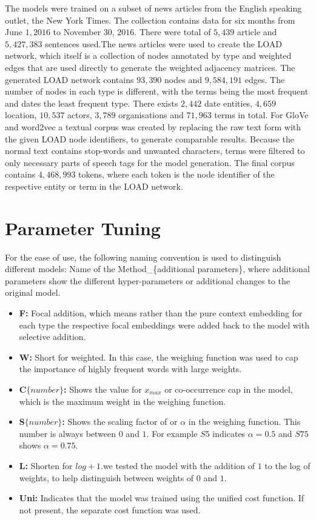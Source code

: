 The models were trained on a subset of news articles from the English speaking outlet, the New York Times. The collection contains data for six months from June $1, 2016$ to November $30$, $2016$. There were total of $5,439$ article and $5,427,383$ sentences used.The news articles were used to create the LOAD network, which itself is a collection of nodes annotated by type and weighted edges that are used directly to generate the weighted adjacency matrices. The generated LOAD network contains $93,390$ nodes and $9,584,191$ edges. The number of nodes in each type is different, with the terms being the most frequent and dates the least frequent type. There exists $2,442$ date entities, $4,659$ location, $10,537$ actors, $3,789$ organisations and $71,963$ terms in total. For GloVe and word2vec a textual corpus was created by replacing the raw text form with the given LOAD node identifiers, to generate comparable results. Because the normal text contains stop-words and unwanted characters, terms were filtered to only necessary parts of speech tags for the model generation. The final corpus contains $4,468,993$ tokens, where each token is the node identifier of the respective entity or term in the LOAD network. 
 
 \section{Parameter Tuning } \label{sec:setup}

For the ease of use, the following naming convention is used to distinguish different models: Name of the Method\_\{additional parameters\}, where additional parameters show the different hyper-parameters or additional changes to the original model. 
\begin{itemize}
\item  \textbf{F:} Focal addition, which means rather than the pure context embedding for each type the respective focal embeddings were added back to the model with selective addition. 
\item \textbf{W:} Short for weighted. In this case, the weighing function was used to cap the importance of highly frequent words with large weights. 
\item \textbf{C$\{ number \}$:} Shows the value for $x_{max}$ or co-occurrence cap in the model, which is the maximum weight in the weighing function. 
\item \textbf{S$\{ number \}$:} Shows the scaling factor of or $\alpha$ in the weighing function. This number is always between $0$ and $1$. For example $S5$ indicates $\alpha=0.5$ and $S75 $ shows $\alpha=0.75$. 
\item \textbf{L:} Shorten for $log+1$.we tested the model with the addition of $1$ to the log of weights, to help distinguish between weights of $0$ and $1$. 

\item \textbf{Uni:} Indicates that the model was trained using the unified cost function. If not present, the separate cost function was used. 
\end{itemize}

